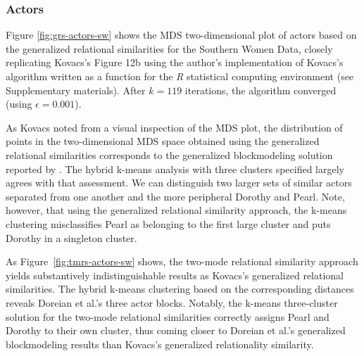 \documentclass[a4paper,fleqn]{cas-sc}
\begin{document}
\subsubsection{Actors}
Figure \ref{fig:grs-actors-sw} shows the MDS two-dimensional plot of actors based on the generalized relational similarities for the Southern Women Data, closely replicating Kovacs's \citeyearpar{kovacs2010} Figure 12b using the author's implementation of Kovacs's algorithm written as a function for the \textit{R} statistical computing environment (see Supplementary materials). After $k = 119$ iterations, the algorithm converged (using $\epsilon = 0.001$). 

As Kovacs noted from a visual inspection of the MDS plot, the distribution of points in the two-dimensional MDS space obtained using the generalized relational similarities corresponds to the generalized blockmodeling solution reported by \citet{doreian2004}. The hybrid k-means analysis with three clusters specified largely agrees with that assessment. We can distinguish two larger sets of similar actors separated from one another and the more peripheral Dorothy and Pearl. Note, however, that using the generalized relational similarity approach, the k-means clustering misclassifies Pearl as belonging to the first large cluster and puts Dorothy in a singleton cluster. 

As Figure~\ref{fig:tmrs-actors-sw} shows, the two-mode relational similarity approach yields substantively indistinguishable results as Kovacs's generalized relational similarities. The hybrid k-means clustering based on the corresponding distances reveals Doreian et al.'s three actor blocks. Notably, the k-means three-cluster solution for the two-mode relational similarities correctly assigns Pearl and Dorothy to their own cluster, thus coming closer to Doreian et al.'s generalized blockmodeling results than Kovacs's generalized relationality similarity. 
\end{document}
